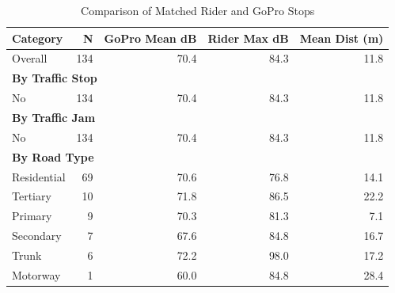 \begin{table}[htbp]
\centering
\caption{Comparison of Matched Rider and GoPro Stops}
\label{tab:comparison}
\begin{tabular}{lrrrr}
\toprule
Category & N & GoPro Mean dB & Rider Max dB & Mean Dist (m) \\
\midrule
Overall & 134 & 70.4 & 84.3 & 11.8 \\
\midrule
\multicolumn{5}{l}{\textbf{By Traffic Stop}} \\
No & 134 & 70.4 & 84.3 & 11.8 \\
\midrule
\multicolumn{5}{l}{\textbf{By Traffic Jam}} \\
No & 134 & 70.4 & 84.3 & 11.8 \\
\midrule
\multicolumn{5}{l}{\textbf{By Road Type}} \\
Residential & 69 & 70.6 & 76.8 & 14.1 \\
Tertiary & 10 & 71.8 & 86.5 & 22.2 \\
Primary & 9 & 70.3 & 81.3 & 7.1 \\
Secondary & 7 & 67.6 & 84.8 & 16.7 \\
Trunk & 6 & 72.2 & 98.0 & 17.2 \\
Motorway & 1 & 60.0 & 84.8 & 28.4 \\
\bottomrule
\end{tabular}
\end{table}
